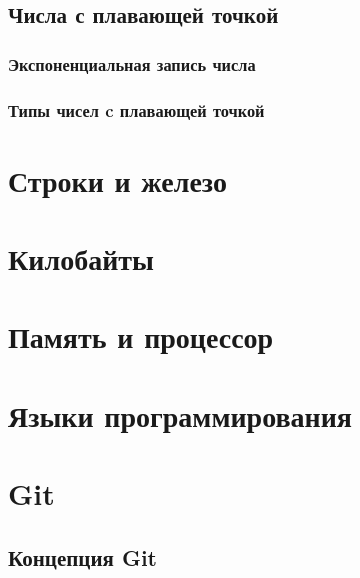 \documentclass[
  letterpaper,
]{scrbook}
\theoremstyle{definition}
\theoremstyle{remark}
\begin{document}
\section{Числа с плавающей точкой}\label{float_iron}

\subsection{Экспоненциальная запись числа}\label{scientific_notation}

\subsection{Типы чисел c плавающей точкой}\label{float_types}


\chapter{Строки и железо}\label{appendix_strings}


\chapter{Килобайты}\label{appendix_kilobytes}


\chapter{Память и процессор}\label{appendix_memory}


\chapter{Языки программирования}\label{appendix_proglang}


\chapter{Git}\label{appendix_git}

\section{Концепция
Git}\label{ux43aux43eux43dux446ux435ux43fux446ux438ux44f-git}
\end{document}
